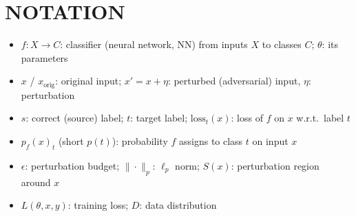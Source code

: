 \section{NOTATION}


\begin{itemize}
  \item $f: X \to C$: classifier (neural network, NN) from inputs $X$ to classes $C$; $\theta$: its parameters
  \item $x$ / $x_\text{orig}$: original input; $x' = x + \eta$: perturbed (adversarial) input, $\eta$: perturbation
  \item $s$: correct (source) label; $t$: target label; $\text{loss}_t(x)$: loss of $f$ on $x$ w.r.t.\ label $t$
  \item $p_f(x)_t$ (short $p(t)$): probability $f$ assigns to class $t$ on input $x$
  \item $\epsilon$: perturbation budget; $\|\cdot\|_p$: $\ell_p$ norm; $S(x)$: perturbation region around $x$
  \item $L(\theta, x, y)$: training loss; $D$: data distribution
\end{itemize}
